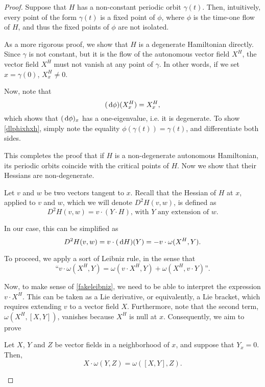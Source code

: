 \begin{proof}
Suppose that $H$ has a non-constant periodic orbit $\gamma(t)$. Then, intuitively, every point of the form $\gamma(t)$ is a fixed point of $\phi$, where $\phi$ is the time-one flow of $H$, and thus the fixed points of $\phi$ are not isolated.

As a more rigorous proof, we show that $H$ is a degenerate Hamiltonian directly. Since $\gamma$ is not constant, but it is the flow of the autonomous vector field $X^H$, the vector field $X^H$ must not vanish at any point of $\gamma$. In other words, if we set $x = \gamma(0)$, $X^H_x \neq 0$.

Now, note that
\begin{equation}\label{dlphixhxh}
(\dl \phi)(X^H_x) = X^H_x,
\end{equation}
which shows that $(\dl \phi)_x$ has a one-eigenvalue, i.e. it is degenerate. To show \eqref{dlphixhxh}, simply note the equality $\phi(\gamma(t)) = \gamma(t)$, and differentiate both sides.

This completes the proof that if $H$ is a non-degenerate autonomous Hamiltonian, its periodic orbits coincide with the critical points of $H$. Now we show that their Hessians are non-degenerate.

Let $v$ and $w$ be two vectors tangent to $x$. Recall that the Hessian of $H$ at $x$, applied to $v$ and $w$, which we will denote $D^2 H(v,w)$, is defined as
\begin{equation}
D^2 H(v,w) = v \cdot (Y \cdot H) \text{, with $Y$ any extension of $w$.}
\end{equation}

In our case, this can be simplified as
\begin{equation}\label{hessian1}
D^2 H(v,w) = v \cdot (\dl H)(Y) = - v \cdot \omega(X^H, Y).
\end{equation}

To proceed, we apply a sort of Leibniz rule, in the sense that
\begin{equation}\label{fakeleibniz}
\text{``$v \cdot \omega(X^H, Y) = \omega(v \cdot X^H, Y) + \omega(X^H, v \cdot Y)$''.}
\end{equation}

Now, to make sense of \eqref{fakeleibniz}, we need to be able to interpret the expression $v \cdot X^H$. This can be taken as a Lie derivative, or equivalently, a Lie bracket, which requires extending $v$ to a vector field $X$. Furthermore, note that the second term, $\omega(X^H, [X,Y])$, vanishes because $X^H$ is null at $x$. Consequently, we aim to prove
\begin{lemma}\label{leibniz1}
Let $X$, $Y$ and $Z$ be vector fields in a neighborhood of $x$, and suppose that $Y_x = 0$. Then,
\begin{equation}
X \cdot \omega(Y,Z) = \omega([X,Y],Z).
\end{equation}
\end{lemma}


\end{proof}
